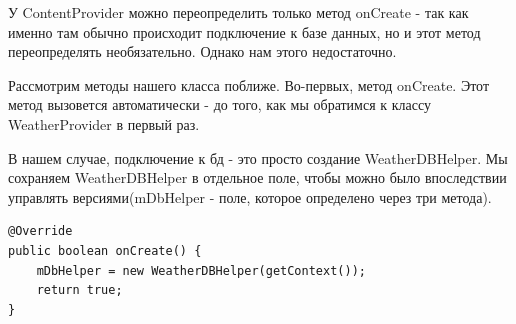 \documentclass[12 pt]{article}
\begin{document}
	    У ContentProvider можно переопределить только метод onCreate - так как именно там обычно происходит подключение к базе данных, но и этот метод переопределять необязательно. Однако нам этого недостаточно.
	    
	     Рассмотрим методы нашего класса поближе. Во-первых, метод onCreate. Этот метод вызовется автоматически - до того, как мы обратимся к классу WeatherProvider в первый раз.

	    В нашем случае, подключение к бд - это просто создание WeatherDBHelper. Мы сохраняем WeatherDBHelper в отдельное поле, чтобы можно было впоследствии управлять версиями(mDbHelper - поле, которое определено через три метода).
	    
	    \begin{lstlisting}
@Override
public boolean onCreate() {
    mDbHelper = new WeatherDBHelper(getContext());
    return true;
}	    
	    \end{lstlisting}
	    
\end{document}
